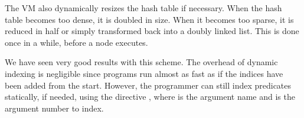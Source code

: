 The VM also dynamically resizes the hash table if necessary. When the hash table
becomes too dense, it is doubled in size. When it becomes too sparse, it is
reduced in half or simply transformed back into a doubly linked list. This is
done once in a while, before a node executes.

We have seen very good results with this scheme. The overhead of dynamic
indexing is negligible since programs run almost as fast as if the indices have
been added from the start. However, the programmer can still index predicates
statically, if needed, using the directive , where
 is the argument name and  is the argument number to index.
